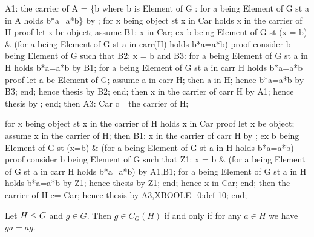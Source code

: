   A1: the carrier of  A = \{b where b is Element of G : for a
  being Element of G st a in A holds b*a=a*b\} by ;
  for x being object st x in Car holds x in the carrier of  H
  proof
    let x be object;
    assume B1: x in Car;
    ex b being Element of G
    st (x = b) & (for a being Element of G st a in carr(H) holds b*a=a*b)
    proof
      consider b being Element of G such that
      B2: x = b and
      B3: for a being Element of G st a in H holds b*a=a*b
      by B1;
      for a being Element of G st a in carr H holds b*a=a*b
      proof
        let a be Element of G;
        assume a in carr H;
        then a in H;
        hence b*a=a*b by B3;
      end;
      hence thesis by B2;
    end;
    then x in the carrier of  carr H by A1;
    hence thesis by ;
  end;
  then A3: Car c= the carrier of  H;

  for x being object st x in the carrier of  H holds x in Car
  proof
    let x be object;
    assume x in the carrier of  H;
    then B1: x in the carrier of  carr H by ;
    ex b being Element of G
    st (x=b) & (for a being Element of G st a in H holds b*a=a*b)
    proof
      consider b being Element of G such that
      Z1: x = b  & (for a being Element of G st a in carr H holds b*a=a*b)
      by A1,B1;
      for a being Element of G st a in H holds b*a=a*b by Z1;
      hence thesis by Z1;
    end;
    hence x in Car;
  end;
  then the carrier of  H c= Car;
  hence thesis by A3,XBOOLE_0:def 10;
end;

\eatline
{}\nwendcode{}\nwdocspar
\begin{theorem}
Let $H\leq G$ and $g\in G$.
Then $g\in C_{G}(H)$ if and only if for any $a\in H$ we have $ga=ag$.
\end{theorem}

